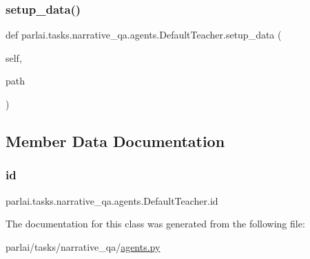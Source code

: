 \subsubsection{\texorpdfstring{setup\+\_\+data()}{setup\_data()}}
{\footnotesize\ttfamily def parlai.\+tasks.\+narrative\+\_\+qa.\+agents.\+Default\+Teacher.\+setup\+\_\+data (\begin{DoxyParamCaption}\item[{}]{self,  }\item[{}]{path }\end{DoxyParamCaption})}



\subsection{Member Data Documentation}
\mbox{\label{classparlai_1_1tasks_1_1narrative__qa_1_1agents_1_1DefaultTeacher_a3eb0cdd21da621da606478fcf09b5e2e}} 
\subsubsection{\texorpdfstring{id}{id}}
{\footnotesize\ttfamily parlai.\+tasks.\+narrative\+\_\+qa.\+agents.\+Default\+Teacher.\+id}



The documentation for this class was generated from the following file\+:\begin{DoxyCompactItemize}
\item 
parlai/tasks/narrative\+\_\+qa/\hyperlink{parlai_2tasks_2narrative__qa_2agents_8py}{agents.\+py}\end{DoxyCompactItemize}
